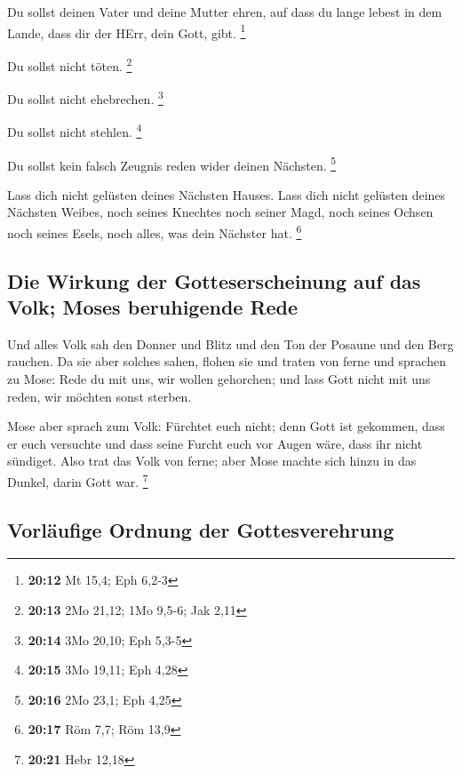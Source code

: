  Du sollst deinen Vater und deine Mutter ehren, auf dass
du lange lebest in dem Lande, dass dir der HErr, dein Gott, gibt.
\footnote{\textbf{20:12} Mt 15,4; Eph 6,2-3}

 Du sollst nicht töten. \footnote{\textbf{20:13} 2Mo
  21,12; 1Mo 9,5-6; Jak 2,11}

 Du sollst nicht ehebrechen. \footnote{\textbf{20:14} 3Mo
  20,10; Eph 5,3-5}

 Du sollst nicht stehlen. \footnote{\textbf{20:15} 3Mo
  19,11; Eph 4,28}

 Du sollst kein falsch Zeugnis reden wider deinen
Nächsten. \footnote{\textbf{20:16} 2Mo 23,1; Eph 4,25}

 Lass dich nicht gelüsten deines Nächsten Hauses. Lass
dich nicht gelüsten deines Nächsten Weibes, noch seines Knechtes noch
seiner Magd, noch seines Ochsen noch seines Esels, noch alles, was dein
Nächster hat. \footnote{\textbf{20:17} Röm 7,7; Röm 13,9}

\hypertarget{die-wirkung-der-gotteserscheinung-auf-das-volk-moses-beruhigende-rede}{%
\subsection{Die Wirkung der Gotteserscheinung auf das Volk; Moses
beruhigende
Rede}\label{die-wirkung-der-gotteserscheinung-auf-das-volk-moses-beruhigende-rede}}

 Und alles Volk sah den Donner und Blitz und den Ton der
Posaune und den Berg rauchen. Da sie aber solches sahen, flohen sie und
traten von ferne  und sprachen zu Mose: Rede du mit uns,
wir wollen gehorchen; und lass Gott nicht mit uns reden, wir möchten
sonst sterben.

 Mose aber sprach zum Volk: Fürchtet euch nicht; denn
Gott ist gekommen, dass er euch versuchte und dass seine Furcht euch vor
Augen wäre, dass ihr nicht sündiget.  Also trat das Volk
von ferne; aber Mose machte sich hinzu in das Dunkel, darin Gott war.
\footnote{\textbf{20:21} Hebr 12,18}

\hypertarget{vorluxe4ufige-ordnung-der-gottesverehrung}{%
\subsection{Vorläufige Ordnung der
Gottesverehrung}\label{vorluxe4ufige-ordnung-der-gottesverehrung}}

